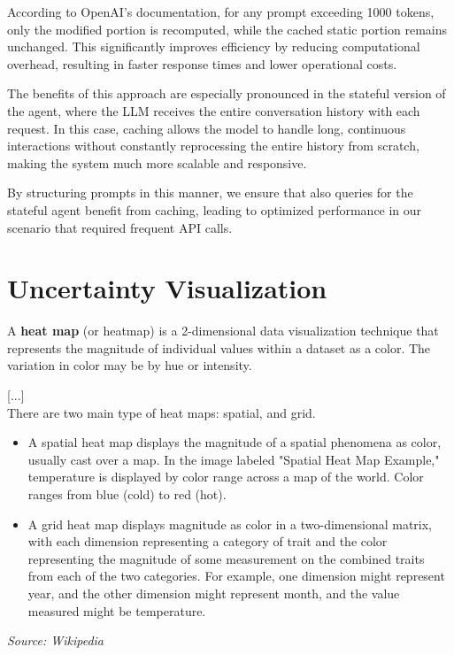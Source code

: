 According to OpenAI's documentation, for any prompt exceeding 1000 tokens, only
the modified portion is recomputed, while the cached static portion remains unchanged.
This significantly improves efficiency by reducing computational overhead, resulting
in faster response times and lower operational costs.

The benefits of this approach are especially pronounced in the stateful version of
the agent, where the LLM receives the entire conversation history with each
request. In this case, caching allows the model to handle long, continuous interactions
without constantly reprocessing the entire history from scratch, making the
system much more scalable and responsive.

By structuring prompts in this manner, we ensure that also queries for the stateful
agent benefit from caching, leading to optimized performance in our scenario
that required frequent API calls.

\section{Uncertainty Visualization}
\label{sec:uncertainty_visualization}

\begin{blockquote}
  A \textbf{heat map} (or heatmap) is a 2-dimensional data visualization
  technique that represents the magnitude of individual values within a dataset
  as a color. The variation in color may be by hue or intensity.

  [...]\\There are two main type of heat maps: spatial, and grid.
  \begin{itemize}
    \item A spatial heat map displays the magnitude of a spatial phenomena as color,
      usually cast over a map. In the image labeled "Spatial Heat Map Example,"
      temperature is displayed by color range across a map of the world. Color ranges
      from blue (cold) to red (hot).

    \item A grid heat map displays magnitude as color in a two-dimensional matrix,
      with each dimension representing a category of trait and the color
      representing the magnitude of some measurement on the combined traits from
      each of the two categories. For example, one dimension might represent
      year, and the other dimension might represent month, and the value
      measured might be temperature.
  \end{itemize}
  \emph{Source: Wikipedia\footnotemark}
\end{blockquote}


